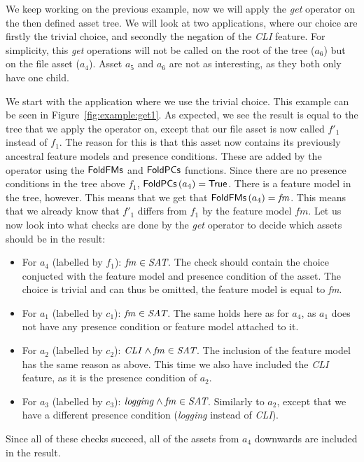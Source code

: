 \begin{example}\label{example:getoperator}
We keep working on the previous example, now we will apply the \emph{get}
operator on the then defined asset tree. We will look at two applications, where our choice are
firstly the trivial choice, and secondly the negation of the \emph{CLI} feature.
For simplicity, this \emph{get} operations will not be called on the root of the tree ($a_6$)
but on the file asset ($a_4$). Asset $a_5$ and $a_6$ are not as interesting, as they both only
have one child.

We start with the application where we use the trivial choice. This example can be seen in
Figure~\ref{fig:example:get1}. As expected, we see the result is equal to the tree that we
apply the operator on, except that our file asset is now called $f'_1$ instead of $f_1$.
The reason for this is that this asset now contains its previously ancestral feature models
and presence conditions. These are added by the operator using the \({\sf FoldFMs}\) and
\({\sf FoldPCs}\) functions. Since there are no presence conditions in the tree above $f_1$,
\({\sf FoldPCs}\left(a_4\right) = {\sf True}\). There is a feature model in the tree, however.
This means that we get that \({\sf FoldFMs}\left(a_4\right) = \mathit{fm}\). This means that we
already know that $f'_1$ differs from $f_1$ by the feature model \(\mathit{fm}\). Let us now
look into what checks are done by the \emph{get} operator to decide which assets should be in
the result:
\begin{itemize}
  \item For $a_4$ (labelled by $f_1$): \(\mathit{fm}\in\textit{SAT}\). The check should contain the
        choice conjucted with the feature model and presence condition of the asset. The choice
        is trivial and can thus be omitted, the feature model is equal to \emph{fm}.
  \item For $a_1$ (labelled by $c_1$): \(\mathit{fm}\in\textit{SAT}\). The same holds here as for $a_4$,
        as $a_1$ does not have any presence condition or feature model attached to it.
  \item For $a_2$ (labelled by $c_2$): \(\mathit{CLI} \land \mathit{fm} \in \textit{SAT}\). The inclusion
        of the feature model has the same reason as above. This time we also have included the
        \emph{CLI} feature, as it is the presence condition of $a_2$.
  \item For $a_3$ (labelled by $c_3$): \(\mathit{logging} \land \mathit{fm} \in \textit{SAT}\). Similarly
        to $a_2$, except that we have a different presence condition (\emph{logging} instead of
        \emph{CLI}).
\end{itemize}
Since all of these checks succeed, all of the assets from $a_4$ downwards are included in the
result.


\end{example}
